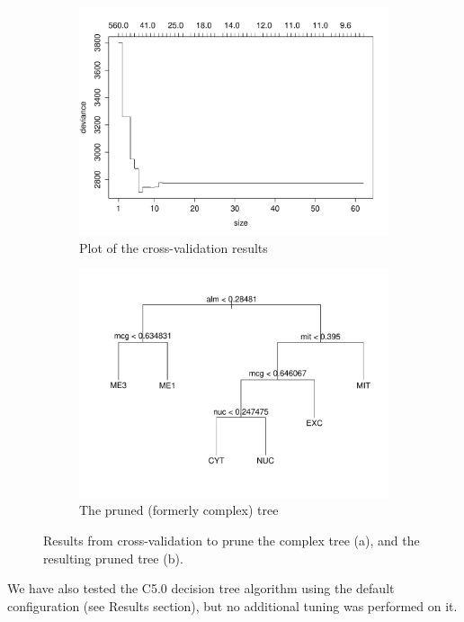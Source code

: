 \documentclass{article}
\begin{document}
\begin{figure}[htbp]
\centering
\begin{subfigure}{.5\textwidth}
  \centering
  \includegraphics[width=.8\linewidth]{figures/complex-tree-cv.pdf}
  \caption{Plot of the cross-validation results}
  \label{fig:sub1}
\end{subfigure}%
\begin{subfigure}{.5\textwidth}
  \centering
  \includegraphics[width=.8\linewidth]{figures/pruned-complex-tree.pdf}
  \caption{The pruned (formerly complex) tree}
  \label{fig:sub2}
\end{subfigure}
\caption{Results from cross-validation to prune the complex tree (a), and the resulting pruned tree (b).}
\label{fig:test}
\end{figure}


We have also tested the C5.0 decision tree algorithm using the default configuration (see Results section), but no additional tuning was performed on it.
\end{document}
